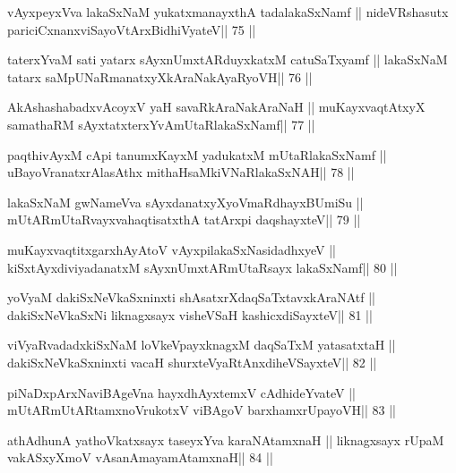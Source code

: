 \begin{shl}
vAyxpeyxVva lakaSxNaM yukatxmanayxthA tadalakaSxNamf ||
nideVRshasutx pariciCxnanxviSayoV\s tArxBidhiVyateV\hfill || 75 ||
\end{shl}

\begin{shl}
taterxYvaM sati yatarx sAyxnUmxtARduyxkatxM catuSaTxyamf ||
lakaSxNaM tatarx saMpUNaRmanatxyXkAraNakAyaRyoVH\hfill || 76 ||
\end{shl}

\begin{shl}
AkAshashabadxvAcoyxV yaH savaRkAraNakAraNaH ||
muKayxvaqtAtxyX samathaRM sAyxtatxterxYvAmUtaRlakaSxNamf\hfill || 77 ||
\end{shl}

\begin{shl}
paqthivAyxM cApi tanumxKayxM yadukatxM mUtaRlakaSxNamf ||
uBayoVranatxrAlasAthx mithaHsaMkiVNaRlakaSxNAH\hfill || 78 ||
\end{shl}

\begin{shl}
lakaSxNaM gwNameVva sAyxdanatxyXyoVmaRdhayxBUmiSu ||
mUtARmUtaRvayxvahaqtisatxthA tatArxpi daqshayxteV\hfill || 79 ||
\end{shl}

\begin{shl}
muKayxvaqtitxgarxhAyAtoV vAyxpilakaSxNasidadhxyeV ||
kiSxtAyxdiviyadanatxM sAyxnUmxtARmUtaRsayx lakaSxNamf\hfill || 80 ||
\end{shl}

\begin{shl}
yoV\s yaM dakiSxNeV\s kaSxninxti shAsatxrXdaqSaTxtavxkAraNAtf ||
dakiSxNeV\s kaSxNi liknagxsayx visheVSaH kashicxdiSayxteV\hfill || 81 ||
\end{shl}

\begin{shl}
viVyaRvadadxkiSxNaM loVkeV\s payxknagxM daqSaTxM yatasatxtaH ||
dakiSxNeV\s kaSxninxti vacaH shurxteVyaRtAnxdiheVSayxteV\hfill || 82 ||
\end{shl}

\begin{shl}
piNaDxpArxNaviBAgeVna hayxdhAyxtemxV cAdhideYvateV ||
mUtARmUtARtamxnoVrukotxV viBAgoV barxhamxrUpayoVH\hfill || 83 ||
\end{shl}

\begin{shl}
athAdhunA yathoVkatxsayx taseyxYva karaNAtamxnaH ||
liknagxsayx rUpaM vakASxyXmoV vAsanAmayamAtamxnaH\hfill || 84 ||
\end{shl}

